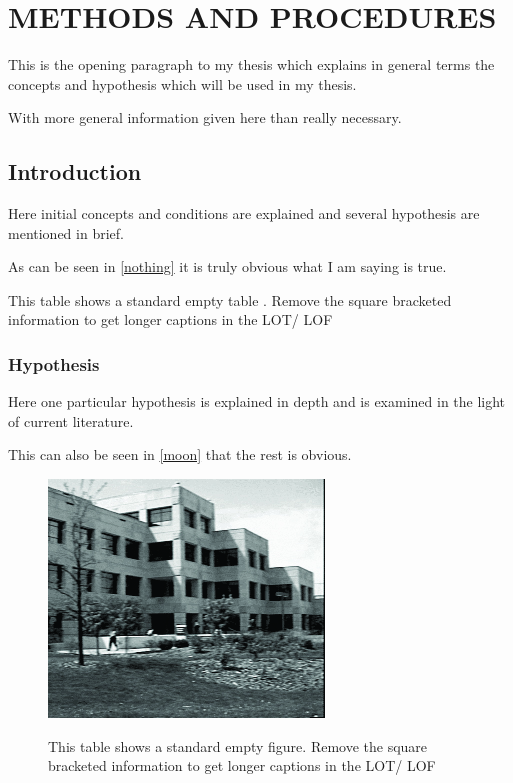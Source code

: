 \chapter{METHODS AND PROCEDURES}

This is the opening paragraph to my thesis which
explains in general terms the concepts and hypothesis
which will be used in my thesis.

With more general information given here than really
necessary.

\section{Introduction}

Here initial concepts and conditions are explained and
several hypothesis are mentioned in brief.

As can be seen in \autoref{nothing} it is truly
obvious what I am saying is true.

\begin{table}[h!tb] \centering

\caption[Short caption for List of Figures/ Tables]{This table shows a standard empty table \autocite{kleeHellyTheoremIts1963}. Remove the square bracketed information to get longer captions in the LOT/ LOF }
\label{nothing}

\vspace{ 2 in}
\end{table}

\subsection{Hypothesis}

Here one particular hypothesis is explained in depth
and is examined in the light of current literature.

This can also be seen in \autoref{moon} that the
rest is obvious.

\begin{figure}[h!tb] \centering

\includegraphics[alt={Alt text describing}]{Images/dc5.jpg}
\caption[Short caption for List of Figures/ Tables]{This table shows a standard empty figure. Remove the square bracketed information to get longer captions in the LOT/ LOF}
\label{moon}
\end{figure}

